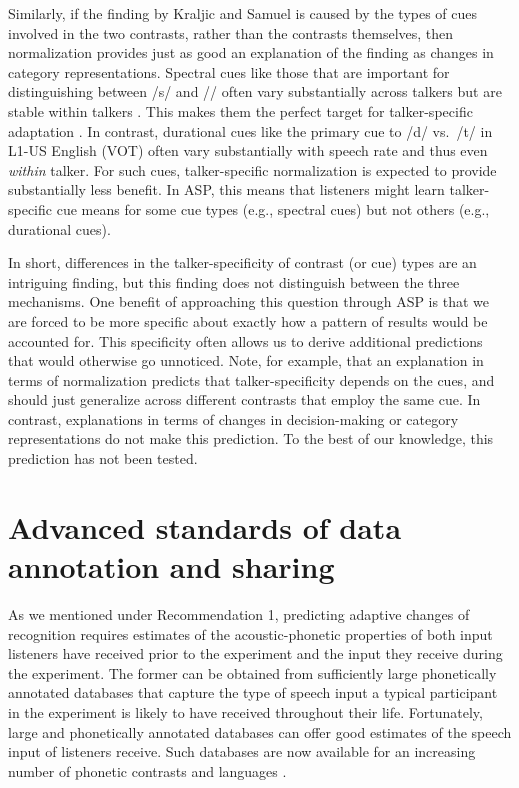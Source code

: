 \documentclass[
  11pt,
  man,floatsintext]{apa6}
\begin{document}
Similarly, if the finding by Kraljic and Samuel is caused by the types of cues involved in the two contrasts, rather than the contrasts themselves, then normalization provides just as good an explanation of the finding as changes in category representations. Spectral cues like those that are important for distinguishing between /s/ and // often vary substantially across talkers but are stable within talkers \autocite[e.g.,][]{heald-nusbaum2015}. This makes them the perfect target for talker-specific adaptation \autocite[see][]{kleinschmidt-jaeger2015}. In contrast, durational cues like the primary cue to /d/ vs.~/t/ in L1-US English (VOT) often vary substantially with speech rate and thus even \emph{within} talker. For such cues, talker-specific normalization is expected to provide substantially less benefit. In ASP, this means that listeners might learn talker-specific cue means for some cue types (e.g., spectral cues) but not others (e.g., durational cues).

In short, differences in the talker-specificity of contrast (or cue) types are an intriguing finding, but this finding does not distinguish between the three mechanisms. One benefit of approaching this question through ASP is that we are forced to be more specific about exactly how a pattern of results would be accounted for. This specificity often allows us to derive additional predictions that would otherwise go unnoticed. Note, for example, that an explanation in terms of normalization predicts that talker-specificity depends on the cues, and should just generalize across different contrasts that employ the same cue. In contrast, explanations in terms of changes in decision-making or category representations do not make this prediction. To the best of our knowledge, this prediction has not been tested.

\section{Advanced standards of data annotation and sharing}\label{sec:DataSharing}

As we mentioned under Recommendation 1, predicting adaptive changes of recognition requires estimates of the acoustic-phonetic properties of both input listeners have received prior to the experiment and the input they receive during the experiment. The former can be obtained from sufficiently large phonetically annotated databases that capture the type of speech input a typical participant in the experiment is likely to have received throughout their life. Fortunately, large and phonetically annotated databases can offer good estimates of the speech input of listeners receive. Such databases are now available for an increasing number of phonetic contrasts and languages \autocites[e.g.,][]{chodroff-wilson2018,clopper-pisoni2006,hillenbrand1995,newman2001,theodore2009}[among many others]{xie-jaeger2020}.
\end{document}
